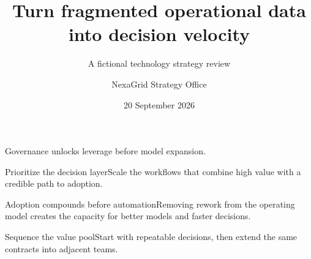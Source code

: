 \documentclass[theme=executive,publication-type=presentation]{reportkit-slides}
\title{Turn fragmented operational data into decision velocity}
\subtitle{A fictional technology strategy review}
\author{NexaGrid Strategy Office}
\date{20 September 2026}
\begin{document}
\begin{frame}[plain]
  \begin{titleslide}
  \end{titleslide}
\end{frame}

\begin{frame}
  \begin{evidenceslide}{Governance unlocks leverage before model expansion.}
    
  \end{evidenceslide}
\end{frame}

\begin{frame}
  \begin{architectureslide}
    
  \end{architectureslide}
\end{frame}

\begin{frame}
  \begin{fullvisual}
    
  \end{fullvisual}
\end{frame}

\begin{frame}
  \begin{visualtext}[left]{Prioritize the decision layer}{Scale the workflows that combine high value with a credible path to adoption.}
    
  \end{visualtext}
\end{frame}

\begin{frame}
  \begin{chartslide}[right]{Adoption compounds before automation}{Removing rework from the operating model creates the capacity for better models and faster decisions.}
    
  \end{chartslide}
\end{frame}

\begin{frame}
  \begin{tableslide}[left]{Sequence the value pool}{Start with repeatable decisions, then extend the same contracts into adjacent teams.}
    
  \end{tableslide}
\end{frame}
\end{document}
